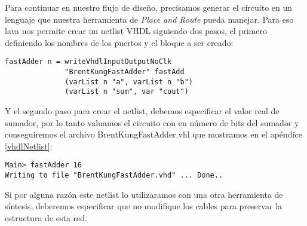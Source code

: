 Para continuar en nuestro flujo de diseño, precisamos generar el circuito en un lenguaje que nuestra herramienta de \emph{Place and Route} pueda manejar. Para eso lava nos permite crear un netlist VHDL siguiendo dos pasos, el primero definiendo los nombres de los puertos y el bloque a ser creado:
\begin{lstlisting}
fastAdder n = writeVhdlInputOutputNoClk
              "BrentKungFastAdder" fastAdd
              (varList n "a", varList n "b")
              (varList n "sum", var "cout")
\end{lstlisting}

Y el segundo paso para crear el netlist, debemos especificar el valor real de sumador, por lo tanto valuamos el circuito con en número de bits del sumador y conseguiremos el archivo BrentKungFastAdder.vhl que mostramos en el apéndice \ref{vhdlNetlist}:
\begin{lstlisting}
Main> fastAdder 16
Writing to file "BrentKungFastAdder.vhd" ... Done..
\end{lstlisting}

\noindent Si por alguna razón este netlist lo utilizaramos con una otra herramienta de síntesis, deberemos especificar que no modifique los cables para preservar la estructura de esta red.

